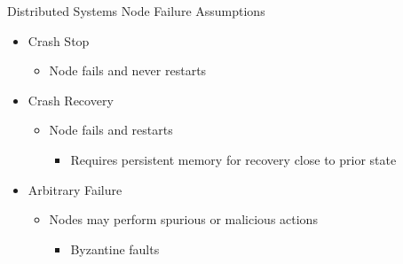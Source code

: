 \documentclass{slide}
\begin{document}
\begin{frame}{Distributed Systems Node Failure Assumptions}
    \vspace{1mm}
    {\LARGE
    \begin{itemize}
        \item<1-> Crash Stop
        \begin{itemize}
            \Large\item Node fails and never restarts
        \end{itemize}
        \vspace{3mm}
        \item<2-> Crash Recovery
        \begin{itemize}
            \Large\item Node fails and restarts
            \begin{itemize}
                \large\item Requires persistent memory for recovery close to prior state
            \end{itemize}
        \end{itemize}
        \vspace{2mm}
        \item<3-> Arbitrary Failure
        \begin{itemize}
            \Large\item Nodes may perform spurious or malicious actions
            \begin{itemize}
                \large\item Byzantine faults
            \end{itemize}
        \end{itemize}
    \end{itemize}
    }
\end{frame}
\end{document}
